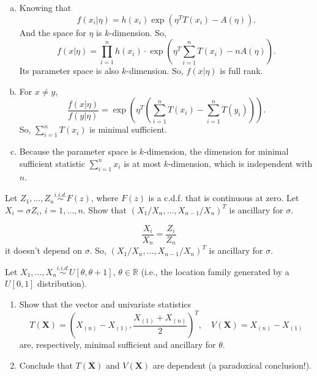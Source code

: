 \begin{solution}
    \begin{enumerate}[(a)]
        \item Knowing that 
        \[
            f(x_i|\eta)=h(x_i)\exp\left(\eta^T T(x_i)-A(\eta)\right). 
        \]
        And the space for $\eta$ is $k$-dimension. So, \[
            f(x|\eta)=\prod_{i=1}^n h(x_i)\cdot\exp\left(\eta^T\sum_{i=1}^nT(x_i)-nA(\eta)\right). 
        \]
        Its parameter space is also $k$-dimension. So, $f(x|\eta)$ is full rank. 
        \item For $x\neq y$, 
        \[
            \frac{f(x|\eta)}{f(y|\eta)}=\exp\left(\eta^T\left(\sum_{i=1}^nT(x_i)-\sum_{i=1}^nT(y_i)\right)\right). 
        \]
        So, $\sum_{i=1}^nT(x_i)$ is minimal sufficient. 
        \item Because the parameter space is $k$-dimension, the dimension for minimal sufficient statistic $\sum_{i=1}^nx_i$ is at most $k$-dimension, which is independent with $n$. 
    \end{enumerate}
\end{solution}

\begin{ex}
    Let \(Z_{1}, \ldots, Z_{n} \stackrel{i.i.d. }{\sim} F(z)\), where \(F(z)\) is a c.d.f. that is continuous at zero. Let \(X_{i}=\sigma Z_{i}\), \(i=1, \ldots, n\). Show that \(\left(X_{1} / X_{n}, \ldots, X_{n-1} / X_{n}\right)^{T}\) is ancillary for \(\sigma\).
\end{ex}

\begin{solution}
    \[
        \frac{X_i}{X_n}=\frac{Z_i}{Z_n}
    \]
    it doesn't depend on $\sigma$. So, \(\left(X_{1} / X_{n}, \ldots, X_{n-1} / X_{n}\right)^{T}\) is ancillary for \(\sigma\). 
\end{solution}

\begin{ex}
    Let \(X_{1}, \ldots, X_{n} \stackrel{i.i.d. }{\sim} U[\theta, \theta+1]\), \(\theta \in \mathbb{R}\) (i.e., the location family generated by a \(U[0,1]\) distribution). 
    \begin{enumerate}
        \item Show that the vector and univariate statistics
        \[
        T(\mathbf{X})=\left(X_{(n)}-X_{(1)}, \frac{X_{(1)}+X_{(n)}}{2}\right)^{T}, \quad V(\mathbf{X})=X_{(n)}-X_{(1)}
        \]
        are, respectively, minimal sufficient and ancillary for \(\theta\). 
        \item Conclude that \(T(\mathbf{X})\) and \(V(\mathbf{X})\) are dependent (a paradoxical conclusion!). 
    \end{enumerate}
\end{ex}

